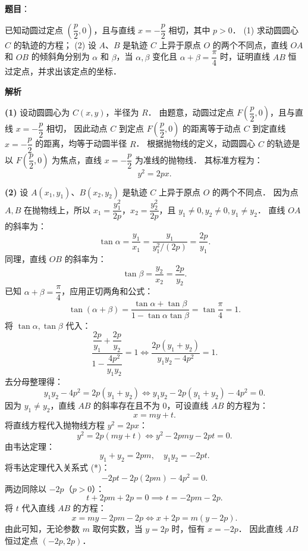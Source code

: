 \begin{answer}

\textbf{题目}：

已知动圆过定点 $\left(\dfrac{p}{2}, 0\right)$，且与直线 $x = -\dfrac{p}{2}$ 相切，其中 $p > 0$．
(1) 求动圆圆心 $C$ 的轨迹的方程；
(2) 设 $A$、$B$ 是轨迹 $C$ 上异于原点 $O$ 的两个不同点，直线 $OA$ 和 $OB$ 的倾斜角分别为 $\alpha$ 和 $\beta$，当 $\alpha, \beta$ 变化且 $\alpha + \beta = \dfrac{\pi}{4}$ 时，证明直线 $AB$ 恒过定点，并求出该定点的坐标．

\textbf{解析}

\textbf{(1)}
设动圆圆心为 $C(x, y)$，半径为 $R$．
由题意，动圆过定点 $F\left(\dfrac{p}{2}, 0\right)$，且与直线 $x = -\dfrac{p}{2}$ 相切，
因此动点 $C$ 到定点 $F\left(\dfrac{p}{2}, 0\right)$ 的距离等于动点 $C$ 到定直线 $x = -\dfrac{p}{2}$ 的距离，均等于动圆半径 $R$．
根据抛物线的定义，动圆圆心 $C$ 的轨迹是以 $F\left(\dfrac{p}{2}, 0\right)$ 为焦点，直线 $x = -\dfrac{p}{2}$ 为准线的抛物线．
其标准方程为：
\nopagebreak[4]
\[
y^2 = 2px.
\]

\textbf{(2)}
设 $A(x_1, y_1)$、$B(x_2, y_2)$ 是轨迹 $C$ 上异于原点 $O$ 的两个不同点．
因为点 $A, B$ 在抛物线上，所以 $x_1 = \dfrac{y_1^2}{2p}$，$x_2 = \dfrac{y_2^2}{2p}$，且 $y_1 \neq 0, y_2 \neq 0, y_1 \neq y_2$．
直线 $OA$ 的斜率为：
\nopagebreak[4]
\[
\tan\alpha = \dfrac{y_1}{x_1} = \dfrac{y_1}{y_1^2 / (2p)} = \dfrac{2p}{y_1}.
\]
同理，直线 $OB$ 的斜率为：
\nopagebreak[4]
\[
\tan\beta = \dfrac{y_2}{x_2} = \dfrac{2p}{y_2}.
\]
已知 $\alpha + \beta = \dfrac{\pi}{4}$，应用正切两角和公式：
\nopagebreak[4]
\[
\tan(\alpha + \beta) = \dfrac{\tan\alpha + \tan\beta}{1 - \tan\alpha \tan\beta} = \tan\dfrac{\pi}{4} = 1.
\]
将 $\tan\alpha, \tan\beta$ 代入：
\nopagebreak[4]
\[
\dfrac{\dfrac{2p}{y_1} + \dfrac{2p}{y_2}}{1 - \dfrac{4p^2}{y_1 y_2}} = 1 \iff \dfrac{2p(y_1 + y_2)}{y_1 y_2 - 4p^2} = 1.
\]
去分母整理得：
\nopagebreak[4]
\[
y_1 y_2 - 4p^2 = 2p(y_1 + y_2) \iff y_1 y_2 - 2p(y_1 + y_2) - 4p^2 = 0. \tag{*}
\]
因为 $y_1 \neq y_2$，直线 $AB$ 的斜率存在且不为 $0$，可设直线 $AB$ 的方程为：
\nopagebreak[4]
\[
x = my + t.
\]
将直线方程代入抛物线方程 $y^2 = 2px$：
\nopagebreak[4]
\[
y^2 = 2p(my + t) \iff y^2 - 2pmy - 2pt = 0.
\]
由韦达定理：
\nopagebreak[4]
\[
y_1 + y_2 = 2pm, \quad y_1 y_2 = -2pt.
\]
将韦达定理代入关系式 (*)：
\nopagebreak[4]
\[
-2pt - 2p(2pm) - 4p^2 = 0.
\]
两边同除以 $-2p$（$p > 0$）：
\nopagebreak[4]
\[
t + 2pm + 2p = 0 \implies t = -2pm - 2p.
\]
将 $t$ 代入直线 $AB$ 的方程：
\nopagebreak[4]
\[
x = my - 2pm - 2p \iff x + 2p = m(y - 2p).
\]
由此可知，无论参数 $m$ 取何实数，当 $y = 2p$ 时，恒有 $x = -2p$．
因此直线 $AB$ 恒过定点 $(-2p, 2p)$．



\end{answer}